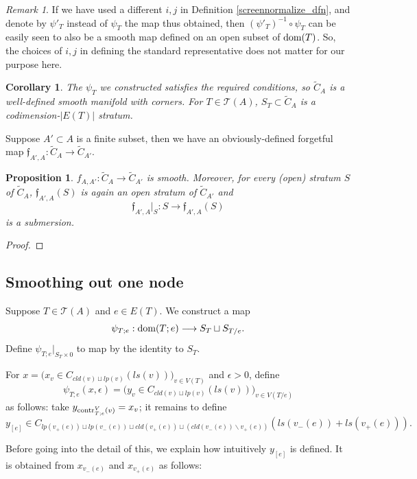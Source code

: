 \documentclass[11pt]{article}
\newtheorem{prp}[thm]{Proposition}
\newtheorem{crl}[thm]{Corollary}
\theoremstyle{definition}
\theoremstyle{remark}
\newtheorem{rmk}[thm]{Remark}
\def\wt#1{\widetilde{#1}}
\def\cT{\mathcal{T}}
\def\ff{\mathfrak{f}}
\def\dom{{\tn{dom}}}
\def\tn#1{\textnormal{#1}}
\begin{document}
\begin{rmk}
If we have used a different $i,j$ in Definition \ref{screennormalize_dfn}, and denote by $\psi'_T$ instead of $\psi_T$ the map thus obtained, then $(\psi'_T)^{-1}\circ\psi_T$ can be easily seen to also be a smooth map defined on an open subset of $\dom(T)$. So, the choices of $i,j$ in defining the standard representative does not matter for our purpose here. 
\end{rmk}

\begin{crl}
The $\psi_T$ we constructed satisfies the required conditions, so $\wt{C}_A$ is a well-defined smooth manifold with corners. For $T\in\cT(A)$, $S_T\subset \wt{C}_A$ is a codimension-$|E(T)|$ stratum. 
\end{crl}

Suppose $A'\subset A$ is a finite subset, then we have an obviously-defined forgetful map $\ff_{A',A}:\wt{C}_A\to\wt{C}_{A'}$. 

\begin{prp}
$f_{A,A'}:\wt{C}_A\to\wt{C}_{A'}$ is smooth. 
Moreover, for every (open) stratum $S$ of $\wt{C}_{A}$, $\ff_{A',A}(S)$ is again an open stratum of $\wt{C}_{A'}$ and 
$$\ff_{A',A}|_S:S\longrightarrow \ff_{A',A}(S)$$
is a submersion. 
\end{prp}

\begin{proof}

\end{proof}



\subsection{Smoothing out one node}

Suppose $T\in\cT(A)$ and $e\in E(T)$. 
We construct a map 
$$\psi_{T;e}: \dom(T;e)\longrightarrow S_T\sqcup S_{T/e}.$$
Define $\psi_{T;e}|_{S_T\times 0}$ to map by the identity to $S_T$. 

For $x=\big(x_v\in C_{cld(v)\sqcup lp(v)}(ls(v))\big)_{v\in V(T)}$ and $\epsilon>0$, define 
$$\psi_{T;e}(x,\epsilon)=\big(y_v\in C_{cld(v)\sqcup lp(v)}(ls(v))\big)_{v\in V(T/e)}$$ 
as follows: 
take $y_{\tn{contr}^V_{T;e}(v)}=x_v$; it remains to define $$y_{[e]}\in C_{lp(v_+(e))\sqcup lp(v_-(e))\sqcup cld(v_+(e))\sqcup (cld(v_-(e))\backslash v_+(e))}(ls(v_-(e))+ls(v_+(e))).$$

Before going into the detail of this, we explain how intuitively $y_{[e]}$ is defined. It is obtained from $x_{v_-(e)}$ and $x_{v_+(e)}$ as follows: 
\end{document}
